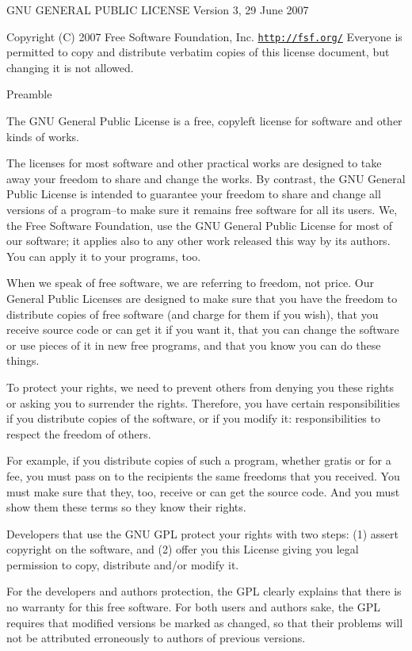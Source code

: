 G\+N\+U G\+E\+N\+E\+R\+A\+L P\+U\+B\+L\+I\+C L\+I\+C\+E\+N\+S\+E Version 3, 29 June 2007

Copyright (C) 2007 Free Software Foundation, Inc. \href{http://fsf.org/}{\tt http\+://fsf.\+org/} Everyone is permitted to copy and distribute verbatim copies of this license document, but changing it is not allowed. \begin{DoxyVerb}                       Preamble
\end{DoxyVerb}


The G\+N\+U General Public License is a free, copyleft license for software and other kinds of works.

The licenses for most software and other practical works are designed to take away your freedom to share and change the works. By contrast, the G\+N\+U General Public License is intended to guarantee your freedom to share and change all versions of a program--to make sure it remains free software for all its users. We, the Free Software Foundation, use the G\+N\+U General Public License for most of our software; it applies also to any other work released this way by its authors. You can apply it to your programs, too.

When we speak of free software, we are referring to freedom, not price. Our General Public Licenses are designed to make sure that you have the freedom to distribute copies of free software (and charge for them if you wish), that you receive source code or can get it if you want it, that you can change the software or use pieces of it in new free programs, and that you know you can do these things.

To protect your rights, we need to prevent others from denying you these rights or asking you to surrender the rights. Therefore, you have certain responsibilities if you distribute copies of the software, or if you modify it\+: responsibilities to respect the freedom of others.

For example, if you distribute copies of such a program, whether gratis or for a fee, you must pass on to the recipients the same freedoms that you received. You must make sure that they, too, receive or can get the source code. And you must show them these terms so they know their rights.

Developers that use the G\+N\+U G\+P\+L protect your rights with two steps\+: (1) assert copyright on the software, and (2) offer you this License giving you legal permission to copy, distribute and/or modify it.

For the developers\textquotesingle{} and authors\textquotesingle{} protection, the G\+P\+L clearly explains that there is no warranty for this free software. For both users\textquotesingle{} and authors\textquotesingle{} sake, the G\+P\+L requires that modified versions be marked as changed, so that their problems will not be attributed erroneously to authors of previous versions.

